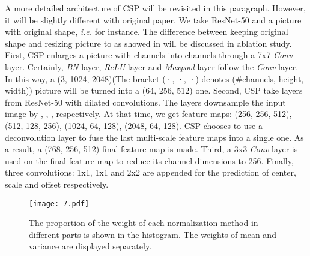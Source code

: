 \documentclass[twocolumn]{article}
\begin{document}
A more detailed architecture of CSP\cite{liu2019high} will be revisited in this paragraph. However, it will be slightly different with original paper\cite{liu2019high}. We take ResNet-50\cite{he2016deep} and a picture with original shape, \textit{i.e.}  for instance. The difference between keeping original shape and resizing picture to  as showed in \cite{liu2019high} will be discussed in ablation study. First, CSP\cite{liu2019high} enlarges a picture with  channels into  channels through a 7x7 \textit{Conv} layer. Certainly, \textit{BN} layer, \textit{ReLU} layer and \textit{Maxpool} layer follow the \textit{Conv} layer. In this way, a (3, 1024, 2048)(The bracket (·, ·, ·) denotes (\#channels, height, width)) picture will be turned into a (64, 256, 512) one. Second, CSP\cite{liu2019high} take  layers from ResNet-50\cite{he2016deep} with dilated convolutions. The  layers downsample the input image by , , ,  respectively. At that time, we get  feature maps: (256, 256, 512), (512, 128, 256), (1024, 64, 128), (2048, 64, 128). CSP\cite{liu2019high} chooses to use a deconvolution layer to fuse the last  multi-scale feature maps into a single one. As a result, a (768, 256, 512) final feature map is made. Third, a 3x3 \textit{Conv} layer is used on the final feature map to reduce its channel dimensions to 256. Finally, three convolutions: 1x1, 1x1 and 2x2 are appended for the prediction of center, scale and offset respectively.
\begin{figure*}[h]
\centering
{}
\texttt{[image: 7.pdf]}
\caption{The proportion of the weight of each normalization method in different parts is shown in the histogram. The weights of mean and variance are displayed separately.}
\label{fig:3}
\end{figure*}
\end{document}
